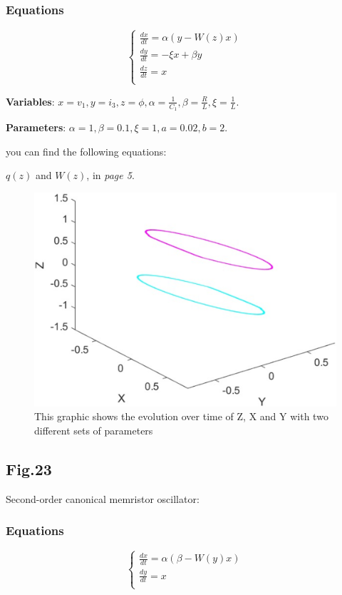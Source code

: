 \documentclass[12pt, a4paper]{paper}
\begin{document}
\subsubsection{Equations}
\begin{equation}
\begin{cases}
\frac{dx}{dt}=\alpha(y-W(z)x)
\\
\frac{dy}{dt}=-\xi x+\beta y
\\
\frac{dz}{dt}=x
\\
\end{cases}
\end{equation}

\textbf{Variables}: $x=v_1, y=i_3, z=\phi, \alpha=\frac{1}{C_1},
\beta=\frac{R}{L}, \xi=\frac{1}{L}$.

\textbf{Parameters}: $\alpha =1, \beta =0.1, \xi =1, a=0.02, b=2$.

you can find the following equations:

$q(z)$ and $W(z)$, in \textit{page 5}.

\begin{figure}[h]
\centering
\includegraphics[width=1\textwidth]{Fig_17.eps}
\caption{This graphic shows the evolution over time of Z, X and Y with two different sets of parameters}
\end{figure}

\newpage
\subsection{Fig.23}
Second-order canonical memristor oscillator:
\subsubsection{Equations}
\begin{equation}
\begin{cases}
\frac{dx}{dt}=\alpha(\beta-W(y)x)
\\
\frac{dy}{dt}=x
\\
\end{cases}
\end{equation}
\end{document}
